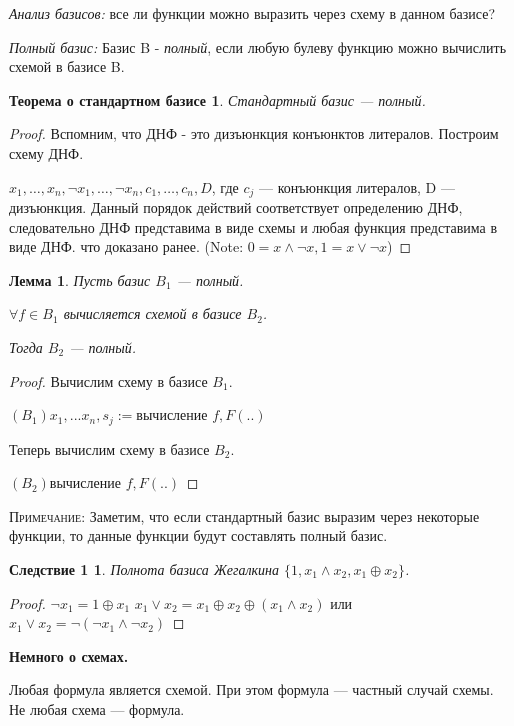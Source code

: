 \documentclass[a4paper, 12pt]{article}
\newtheorem*{standartbase}{Теорема о стандартном базисе}
\newtheorem*{fulllemma}{Лемма}
\newtheorem*{sl1}{Следствие 1}
\begin{document}
 \textit{Анализ базисов: } все ли функции можно выразить через схему в данном базисе?
 
 \textit{Полный базис: } Базис B - \textit{полный}, если любую булеву функцию можно вычислить схемой в базисе B.
 
 \begin{standartbase}
 Стандартный базис --- полный.
 \end{standartbase}
 \begin{proof}
Вспомним, что ДНФ - это дизъюнкция конъюнктов литералов. Построим схему ДНФ.

$x_1, \ldots ,x_n, \lnot x_1, \ldots ,\lnot x_n, c_1, \ldots ,c_n, D$, где $c_j$ --- конъюнкция литералов, D --- дизъюнкция. Данный порядок действий соответствует определению ДНФ, следовательно ДНФ представима в виде схемы и любая функция представима в виде ДНФ. что доказано ранее. (Note: $0 = x \wedge \lnot x, 1 = x \vee \lnot x$)
\end{proof}

 \begin{fulllemma}
Пусть базис $B_1$ --- полный.

$\forall f \in B_1$ вычисляется схемой в базисе $B_2$.

Тогда $B_2$ --- полный.
 \end{fulllemma}
 \begin{proof}
 Вычислим схему в базисе $B_1$.
 
$(B_1) x_1,... x_n,s_j := $вычисление $f, F(..)$

Теперь вычислим схему в базисе $B_2$.

$(B_2) 			   $вычисление $f, F(..)$

\end{proof}
\textsc{Примечание: } Заметим, что если стандартный базис выразим через некоторые функции, то данные функции будут составлять полный базис.

\begin{sl1}
Полнота базиса Жегалкина $\{1, x_1 \wedge x_2, x_1 \oplus x_2\}$.
\end{sl1}
\begin{proof}
$\lnot x_1 = 1 \oplus x_1$ $x_1 \vee x_2 = x_1 \oplus x_2 \oplus (x_1 \wedge x_2)$ или $x_1 \vee x_2 = \lnot (\lnot x_1 \wedge \lnot x_2)$
\end{proof}

\textbf{Немного о схемах.}

Любая формула является схемой. При этом формула --- частный случай схемы. Не любая схема --- формула.
\end{document}

